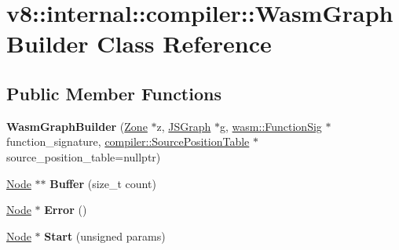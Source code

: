 \hypertarget{classv8_1_1internal_1_1compiler_1_1_wasm_graph_builder}{}\section{v8\+:\+:internal\+:\+:compiler\+:\+:Wasm\+Graph\+Builder Class Reference}
\label{classv8_1_1internal_1_1compiler_1_1_wasm_graph_builder}
\subsection*{Public Member Functions}
\begin{DoxyCompactItemize}
\item 
{\bfseries Wasm\+Graph\+Builder} (\hyperlink{classv8_1_1internal_1_1_zone}{Zone} $\ast$z, \hyperlink{classv8_1_1internal_1_1compiler_1_1_j_s_graph}{J\+S\+Graph} $\ast$g, \hyperlink{classv8_1_1internal_1_1_signature}{wasm\+::\+Function\+Sig} $\ast$function\+\_\+signature, \hyperlink{classv8_1_1internal_1_1compiler_1_1_source_position_table}{compiler\+::\+Source\+Position\+Table} $\ast$source\+\_\+position\+\_\+table=nullptr)\hypertarget{classv8_1_1internal_1_1compiler_1_1_wasm_graph_builder_ace35544806c409550476fb59ad2af00c}{}\label{classv8_1_1internal_1_1compiler_1_1_wasm_graph_builder_ace35544806c409550476fb59ad2af00c}

\item 
\hyperlink{classv8_1_1internal_1_1compiler_1_1_node}{Node} $\ast$$\ast$ {\bfseries Buffer} (size\+\_\+t count)\hypertarget{classv8_1_1internal_1_1compiler_1_1_wasm_graph_builder_a924252c21b42b5a78c148854e8e21e08}{}\label{classv8_1_1internal_1_1compiler_1_1_wasm_graph_builder_a924252c21b42b5a78c148854e8e21e08}

\item 
\hyperlink{classv8_1_1internal_1_1compiler_1_1_node}{Node} $\ast$ {\bfseries Error} ()\hypertarget{classv8_1_1internal_1_1compiler_1_1_wasm_graph_builder_a12010451052b3336633e95852d7574ea}{}\label{classv8_1_1internal_1_1compiler_1_1_wasm_graph_builder_a12010451052b3336633e95852d7574ea}

\item 
\hyperlink{classv8_1_1internal_1_1compiler_1_1_node}{Node} $\ast$ {\bfseries Start} (unsigned params)\hypertarget{classv8_1_1internal_1_1compiler_1_1_wasm_graph_builder_a92ca9c114840c6f96ce8d19d4cef501c}{}\label{classv8_1_1internal_1_1compiler_1_1_wasm_graph_builder_a92ca9c114840c6f96ce8d19d4cef501c}


\end{DoxyCompactItemize}
